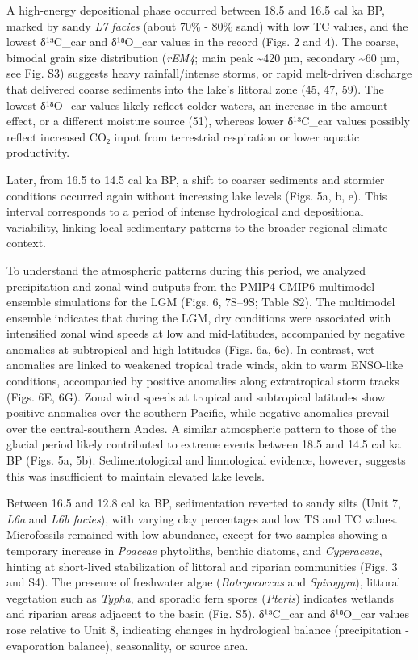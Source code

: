 \documentclass[
]{article}
\begin{document}
A high-energy depositional phase occurred between 18.5 and 16.5 cal ka
BP, marked by sandy \emph{L7 facies} (about 70\% - 80\% sand) with low
TC values, and the lowest δ¹³C\_car and δ¹⁸O\_car values in the record
(Figs. 2 and 4). The coarse, bimodal grain size distribution
(\emph{rEM4}; main peak \textasciitilde420 µm, secondary
\textasciitilde60 µm, see Fig. S3) suggests heavy rainfall/intense
storms, or rapid melt-driven discharge that delivered coarse sediments
into the lake's littoral zone (45, 47, 59). The lowest δ¹⁸O\_car values
likely reflect colder waters, an increase in the amount effect, or a
different moisture source (51), whereas lower δ¹³C\_car values possibly
reflect increased CO₂ input from terrestrial respiration or lower
aquatic productivity.

Later, from 16.5 to 14.5 cal ka BP, a shift to coarser sediments and
stormier conditions occurred again without increasing lake levels (Figs.
5a, b, e). This interval corresponds to a period of intense hydrological
and depositional variability, linking local sedimentary patterns to the
broader regional climate context.

To understand the atmospheric patterns during this period, we analyzed
precipitation and zonal wind outputs from the PMIP4-CMIP6 multimodel
ensemble simulations for the LGM (Figs. 6, 7S--9S; Table S2). The
multimodel ensemble indicates that during the LGM, dry conditions were
associated with intensified zonal wind speeds at low and mid-latitudes,
accompanied by negative anomalies at subtropical and high latitudes
(Figs. 6a, 6c). In contrast, wet anomalies are linked to weakened
tropical trade winds, akin to warm ENSO-like conditions, accompanied by
positive anomalies along extratropical storm tracks (Figs. 6E, 6G).
Zonal wind speeds at tropical and subtropical latitudes show positive
anomalies over the southern Pacific, while negative anomalies prevail
over the central-southern Andes. A similar atmospheric pattern to those
of the glacial period likely contributed to extreme events between 18.5
and 14.5 cal ka BP (Figs. 5a, 5b). Sedimentological and limnological
evidence, however, suggests this was insufficient to maintain elevated
lake levels.

Between 16.5 and 12.8 cal ka BP, sedimentation reverted to sandy silts
(Unit 7, \emph{L6a} and \emph{L6b facies}), with varying clay
percentages and low TS and TC values. Microfossils remained with low
abundance, except for two samples showing a temporary increase in
\emph{Poaceae} phytoliths, benthic diatoms, and \emph{Cyperaceae},
hinting at short-lived stabilization of littoral and riparian
communities (Figs. 3 and S4). The presence of freshwater algae
(\emph{Botryococcus} and \emph{Spirogyra}), littoral vegetation such as
\emph{Typha}, and sporadic fern spores (\emph{Pteris}) indicates
wetlands and riparian areas adjacent to the basin (Fig. S5). δ¹³C\_car
and δ¹⁸O\_car values rose relative to Unit 8, indicating changes in
hydrological balance (precipitation - evaporation balance), seasonality,
or source area.
\end{document}
